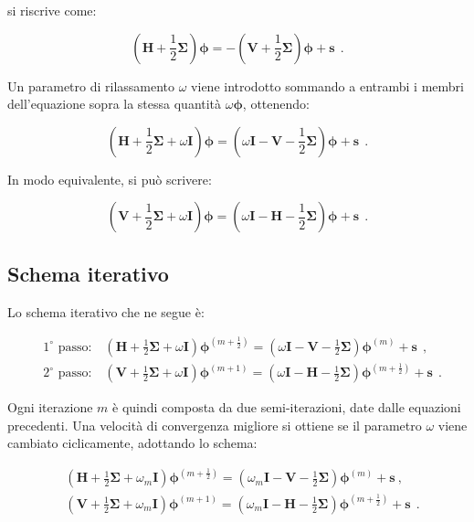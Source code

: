 si riscrive come:

\[
\left(\mathbf{H} + \frac{1}{2} \mathbf{\Sigma}\right) \mathbf{\phi} = -\left(\mathbf{V} + \frac{1}{2} \mathbf{\Sigma}\right) \mathbf{\phi} + \mathbf{s}\ \ . 
\]

Un parametro di rilassamento \(\omega\) viene introdotto sommando a entrambi i membri dell'equazione sopra la stessa quantità \(\omega \mathbf{\phi}\), ottenendo:

\[
\left(\mathbf{H} + \frac{1}{2} \mathbf{\Sigma} + \omega \mathbf{I}\right) \mathbf{\phi} = \left(\omega \mathbf{I} - \mathbf{V} - \frac{1}{2} \mathbf{\Sigma}\right) \mathbf{\phi} + \mathbf{s}\ \ . 
\]

In modo equivalente, si può scrivere:

\[
\left(\mathbf{V} + \frac{1}{2} \mathbf{\Sigma} + \omega \mathbf{I}\right) \mathbf{\phi} = \left(\omega \mathbf{I} - \mathbf{H} - \frac{1}{2} \mathbf{\Sigma}\right) \mathbf{\phi} + \mathbf{s}\ \ . 
\]



\subsection{Schema iterativo}

Lo schema iterativo che ne segue è:

\[ \begin{aligned}
& \text{$1^{\circ}$ passo:} \quad \left(\mathbf{H} + \frac{1}{2} \mathbf{\Sigma} + \omega \mathbf{I}\right) \mathbf{\phi}^{\left(m+\frac{1}{2}\right)} = \left(\omega \mathbf{I} - \mathbf{V} - \frac{1}{2} \mathbf{\Sigma}\right) \mathbf{\phi}^{(m)} + \mathbf{s}\ \ ,  \\
& \text{$2^{\circ}$ passo:} \quad \left(\mathbf{V} + \frac{1}{2} \mathbf{\Sigma} + \omega \mathbf{I}\right) \mathbf{\phi}^{(m+1)} = \left(\omega \mathbf{I} - \mathbf{H} - \frac{1}{2} \mathbf{\Sigma}\right) \mathbf{\phi}^{\left(m+\frac{1}{2}\right)} + \mathbf{s}\ \ . \end{aligned}\]

Ogni iterazione \(m\) è quindi composta da due semi-iterazioni, date dalle equazioni precedenti.
Una velocità di convergenza migliore si ottiene se il parametro \(\omega\) viene cambiato ciclicamente, adottando lo schema:

\[
\begin{aligned}
	& \left(\mathbf{H} + \frac{1}{2} \mathbf{\Sigma} + \omega_m \mathbf{I}\right) \mathbf{\phi}^{\left(m+\frac{1}{2}\right)} = \left(\omega_m \mathbf{I} - \mathbf{V} - \frac{1}{2} \mathbf{\Sigma}\right) \mathbf{\phi}^{(m)} + \mathbf{s}\ , \\
	& \left(\mathbf{V} + \frac{1}{2} \mathbf{\Sigma} + \omega_m \mathbf{I}\right) \mathbf{\phi}^{(m+1)} = \left(\omega_m \mathbf{I} - \mathbf{H} - \frac{1}{2} \mathbf{\Sigma}\right) \mathbf{\phi}^{\left(m+\frac{1}{2}\right)} + \mathbf{s}\ \ . 
\end{aligned}
\]



